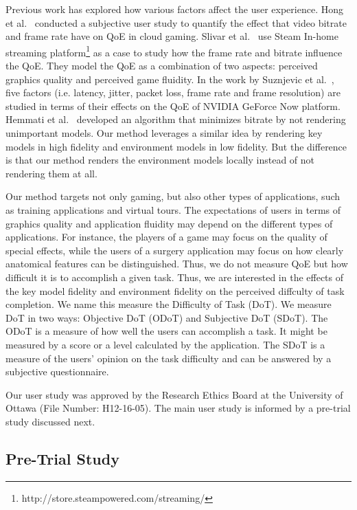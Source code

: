 Previous work has explored how various factors affect the user experience. Hong et al.~\cite{hong2015user-study} conducted a subjective user study to quantify the effect that video bitrate and frame rate have on QoE in cloud gaming.
Slivar et al.~\cite{slivar2015qoe} use Steam In-home streaming platform\footnote{http://store.steampowered.com/streaming/} as a case to study how the frame rate and bitrate influence the QoE. They model the QoE as a combination of two aspects: perceived graphics quality and perceived game fluidity.
In the work by Suznjevic et al.~\cite{suznjevic2016}, five factors (i.e. latency, jitter, packet loss, frame rate and frame resolution) are studied in terms of their effects on the QoE of NVIDIA GeForce Now platform.
Hemmati et al.~\cite{hemmati2013bitrate} developed an algorithm that minimizes bitrate by not rendering unimportant models. Our method leverages a similar idea by rendering key models in high fidelity and environment models in low fidelity. But the difference is that our method renders the environment models locally instead of not rendering them at all.

Our method targets not only gaming, but also other types of applications, such as training applications and virtual tours. The expectations of users in terms of graphics quality and application fluidity may depend on the different types of applications. For instance, the players of a game may focus on the quality of special effects, while the users of a surgery application may focus on how clearly anatomical features can be distinguished. Thus, we do not measure QoE but how difficult it is to accomplish a given task. Thus, we are interested in the effects of the key model fidelity and environment fidelity on the perceived diffculty of task completion. We name this measure the Difficulty of Task (DoT). We measure DoT in two ways: Objective DoT (ODoT) and Subjective DoT (SDoT).
The ODoT is a measure of how well the users can accomplish a task. It might be measured by a score or a level calculated by the application.
The SDoT is a measure of the users' opinion on the task difficulty and can be answered by a subjective questionnaire.

Our user study was approved by the Research Ethics Board at the University of Ottawa (File Number: H12-16-05).
The main user study is informed by a pre-trial study discussed next.

\subsection{Pre-Trial Study}
\label{sec:hrr:us:pts}


